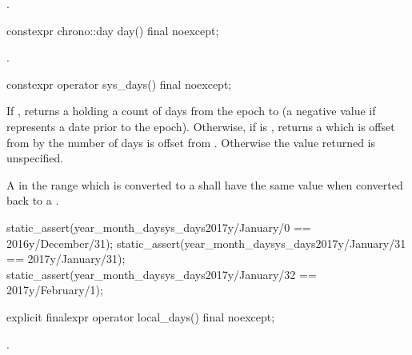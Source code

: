 \begin{itemdescr}
\pnum
\returns {}.
\end{itemdescr}

%
\begin{itemdecl}
constexpr chrono::day day() final noexcept;
\end{itemdecl}

\begin{itemdescr}
\pnum
\returns {}.
\end{itemdescr}

%
\begin{itemdecl}
constexpr operator sys_days() final noexcept;
\end{itemdecl}

\begin{itemdescr}
\pnum
\returns
If ,
returns a 
holding a count of days from the  epoch to 
(a negative value if  represents a date prior to the  epoch).
Otherwise, if  is ,
returns a 
which is offset from 
by the number of days  is offset from .
Otherwise the value returned is unspecified.

\pnum
\remarks
A  in the range 
which is converted to a 
shall have the same value when converted back to a .

\pnum
\begin{example}
\begin{codeblock}
static_assert(year_month_day{sys_days{2017y/January/0}}  == 2016y/December/31);
static_assert(year_month_day{sys_days{2017y/January/31}} == 2017y/January/31);
static_assert(year_month_day{sys_days{2017y/January/32}} == 2017y/February/1);
\end{codeblock}
\end{example}
\end{itemdescr}

%
\begin{itemdecl}
explicit finalexpr operator local_days() final noexcept;
\end{itemdecl}

\begin{itemdescr}
\pnum
\returns {}.
\end{itemdescr}

